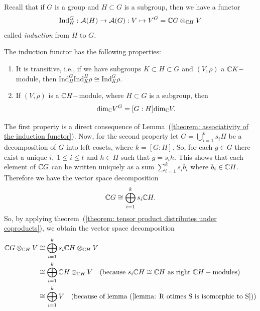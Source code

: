 Recall that if $G$ is a group and $H\subset G$ is a subgroup, then we have a functor 
\begin{equation}
    \text{Ind}_H^G:\mathcal{A}(H)\rightarrow\mathcal{A}(G): V\mapsto V^G= \mathbb{C}G\otimes_{\mathbb{C}H}V
\end{equation}
called \textit{induction} from $H$ to $G$. 
\begin{dang}
\begin{theorem}\label{theorem: properties of induction of reps of groups}
The induction functor has the following properties:
\begin{enumerate}
    \item[(1)] It is transitive, i.e., if we have subgroups $K\subset H\subset G$ and $(V,\rho)$ a $\mathbb{C}K-$module, then $\text{Ind}_H^G\text{Ind}_K^H\rho \cong \text{Ind}_K^G\rho$.
    \item[(2)] If $(V,\rho)$ is a $\mathbb{C}H-$module, where $H\subset G$ is a subgroup, then 
    \begin{equation}
        \text{dim}_{\mathbb{C}}V^G=[G:H]\text{dim}_{\mathbb{C}}V.
    \end{equation}
\end{enumerate}
\end{theorem}
\end{dang}
The first property is a direct consequence of Lemma~(\ref{theorem: associativity of the induction functor}). Now, for the second property let $G=\bigcup_{i=1}^ks_iH$ be a decomposition of $G$ into left cosets, where $k=[G:H]$. So, for each $g\in G$ there exist a unique $i,\;1\leq i \leq t$ and $h\in H$ such that $g=s_ih$. This shows that each element of $\mathbb{C}G$ can be written uniquely as a sum $\sum_{i=1}^ks_ib_i$ where $b_i\in\mathbb{C}H$. Therefore we have the vector space decomposition
\begin{equation}
    \mathbb{C}G \cong \bigoplus_{i=1}^ks_i\mathbb{C}H.
\end{equation}
So, by applying theorem~(\ref{theorem: tensor product distributes under coproducts}), we obtain the vector space decomposition
\begin{equation}
\begin{split}
    \mathbb{C}G\otimes_{\mathbb{C}H}V&\cong\bigoplus_{i=1}^ks_i\mathbb{C}H\otimes_{\mathbb{C}H} V\\
    &\cong \bigoplus_{i=1}^k\mathbb{C}H\otimes_{\mathbb{C}H}V\quad\text{(because }s_i\mathbb{C}H\cong \mathbb{C}H\text{ as right }\mathbb{C}H-\text{modules)}\\
    &\cong\bigoplus_{i=1}^kV\quad\text{(because of lemma~(\ref{lemma: R otimes S is isomorphic to S}))}
\end{split}
\end{equation}
